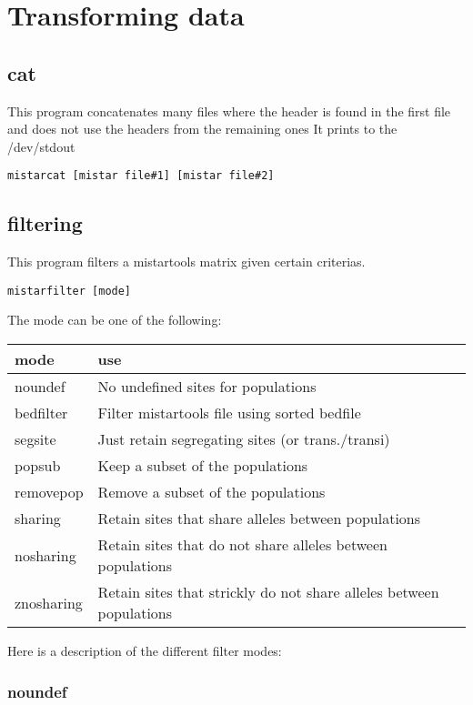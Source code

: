 \documentclass[a4paper]{article}
\begin{document}
\section{Transforming data}
\subsection{cat }
This program concatenates many files where the header is found in the
first file and does not use the headers from the remaining ones
It prints to the /dev/stdout
\begin{verbatim}
mistarcat [mistar file#1] [mistar file#2]
\end{verbatim}


\subsection{filtering}

This program filters a mistartools matrix given certain criterias.

\begin{verbatim}
mistarfilter [mode]
\end{verbatim}

The mode can be one of the following:

\begin{tabular}{ll}
\hline
mode & use \\
\hline
noundef      &   No undefined sites for populations \\
bedfilter    &   Filter mistartools file using sorted bedfile \\
segsite      &   Just retain segregating sites (or trans./transi) \\
popsub       &   Keep a subset of the populations \\
removepop    &   Remove a subset of the populations \\
sharing      &   Retain sites that share alleles between populations \\
nosharing    &   Retain sites that do not share alleles between populations \\
znosharing   &   Retain sites that strickly do not share alleles between populations \\
\end{tabular}

Here is a description of the different filter modes:

\subsubsection{noundef}
\end{document}
